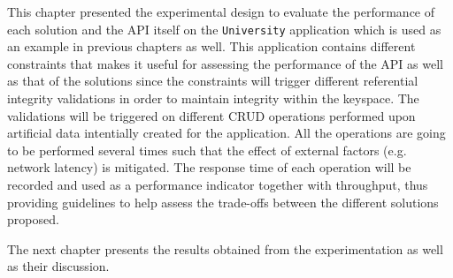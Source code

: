 This chapter  presented the experimental design to evaluate the performance of
each  solution and the  \ac{API} itself on the \texttt{University} application
which is  used as an example in previous chapters as well. This application
contains different constraints that makes it useful for assessing the
performance of the \ac{API} as well as that of the solutions since the
 constraints  will trigger different referential integrity validations in order
 to maintain integrity within the keyspace. The validations will be triggered on
 different \ac{CRUD} operations performed upon artificial data intentially
 created for the application. All the operations are going to be performed 
  several times such that the effect of external factors (e.g. network latency)
 is mitigated. The response time of each operation will be recorded and 
 used as a performance indicator together with throughput, thus providing 
 guidelines to help assess the trade-offs between the different solutions
proposed.
	
	
The next chapter presents the results obtained from the experimentation as well 
as their discussion.
 






